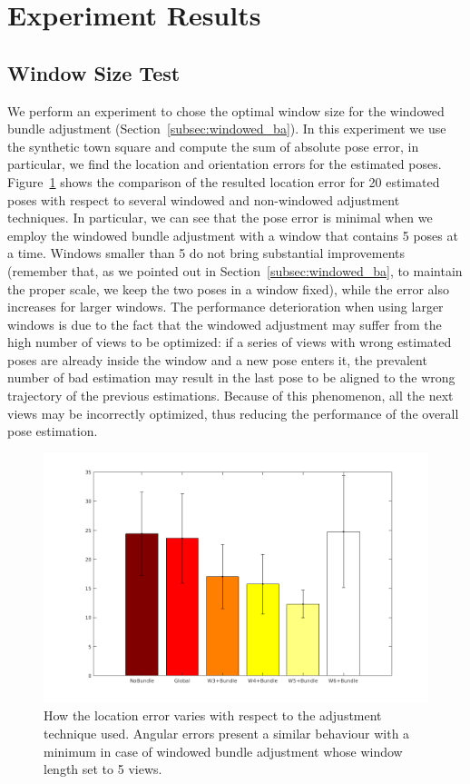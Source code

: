\section{Experiment Results}
\subsection{Window Size Test}
We perform an experiment to chose the optimal window size for the windowed
bundle adjustment (Section~\ref{subsec:windowed_ba}). In this experiment we
use the synthetic town square and compute the sum of absolute pose error, in
particular, we find the location and orientation errors for the estimated poses.
Figure~\ref{fig:sumAbsLocError} shows the comparison of the resulted location error for 20
estimated poses with respect to several windowed and non-windowed adjustment
techniques.
In particular, we can see that the pose error is minimal when we employ the
windowed bundle adjustment with a window that contains 5 poses at a time.
Windows smaller than 5 do not bring substantial improvements (remember that,
as we pointed out in Section~\ref{subsec:windowed_ba}, to maintain the proper scale, we keep the two poses
in a window fixed), while the error also increases
for larger windows. The performance deterioration when using larger windows
is due to the fact that the windowed adjustment may suffer from the high number
of views to be optimized: if a series of views with wrong estimated poses are
already inside the window and a new pose enters it, the prevalent number of
bad estimation may result in the last pose to be aligned to the wrong trajectory
of the previous estimations. Because of this phenomenon, all the next views
may be incorrectly optimized, thus reducing the performance of the overall
pose estimation.
%
\begin{figure}[h]
\centering
\includegraphics[width=\linewidth]{img/sumAbsLocError.png}
\caption{How the location error varies with respect to the adjustment technique
used. Angular errors present a similar behaviour with a minimum in case
of windowed bundle adjustment whose window length set to 5 views.}
\label{fig:sumAbsLocError}
\end{figure}

